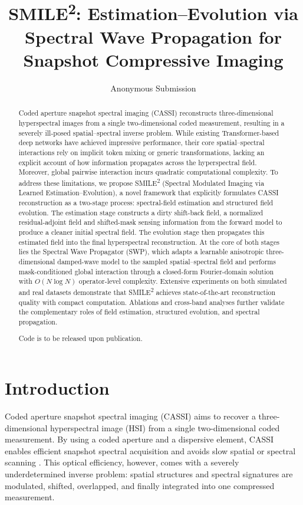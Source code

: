 \documentclass[letterpaper]{article} %
\title{SMILE\textsuperscript{2}: Estimation--Evolution via Spectral Wave Propagation for Snapshot Compressive Imaging}
\author{Anonymous Submission}
\newcommand{\smiletwo}{SMILE\textsuperscript{2}}
\newcommand{\swp}{\textsc{SWP}}
\begin{document}
\maketitle

\begin{abstract}
Coded aperture snapshot spectral imaging (CASSI) reconstructs three-dimensional hyperspectral images from a single two-dimensional coded measurement, resulting in a severely ill-posed spatial--spectral inverse problem.
While existing Transformer-based deep networks have achieved impressive performance, their core spatial--spectral interactions rely on implicit token mixing or generic transformations, lacking an explicit account of how information propagates across the hyperspectral field.
Moreover, global pairwise interaction incurs quadratic computational complexity.
To address these limitations, we propose \smiletwo{} (Spectral Modulated Imaging via Learned Estimation--Evolution), a novel framework that explicitly formulates CASSI reconstruction as a two-stage process: spectral-field estimation and structured field evolution.
The estimation stage constructs a dirty shift-back field, a normalized residual-adjoint field and shifted-mask sensing information from the forward model to produce a cleaner initial spectral field.
The evolution stage then propagates this estimated field into the final hyperspectral reconstruction.
At the core of both stages lies the Spectral Wave Propagator (\swp{}), which adapts a learnable anisotropic three-dimensional damped-wave model to the sampled spatial--spectral field and performs mask-conditioned global interaction through a closed-form Fourier-domain solution with $O(N\log N)$ operator-level complexity.
Extensive experiments on both simulated and real datasets demonstrate that \smiletwo{} achieves state-of-the-art reconstruction quality with compact computation.
Ablations and cross-band analyses further validate the complementary roles of field estimation, structured evolution, and spectral propagation.

Code is to be released upon publication.
\end{abstract}

\section{Introduction}

Coded aperture snapshot spectral imaging (CASSI) aims to recover a three-dimensional hyperspectral image (HSI) from a single two-dimensional coded measurement.
By using a coded aperture and a dispersive element, CASSI enables efficient snapshot spectral acquisition and avoids slow spatial or spectral scanning \cite{wagadarikar2008cassi,gehm2007ddcassi}.
This optical efficiency, however, comes with a severely underdetermined inverse problem: spatial structures and spectral signatures are modulated, shifted, overlapped, and finally integrated into one compressed measurement.
\end{document}
